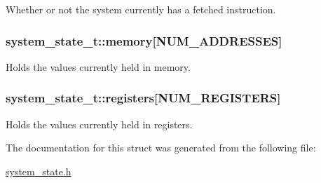 Whether or not the system currently has a fetched instruction. 

\subsubsection[{\texorpdfstring{memory}{memory}}]{ system\+\_\+state\+\_\+t\+::memory\mbox{[}{\bf N\+U\+M\+\_\+\+A\+D\+D\+R\+E\+S\+S\+ES}\mbox{]}}\hypertarget{structsystem__state__t_ade4e6995025b3b8eeeb62bdb38408765}{}\label{structsystem__state__t_ade4e6995025b3b8eeeb62bdb38408765}


Holds the values currently held in memory. 

\subsubsection[{\texorpdfstring{registers}{registers}}]{ system\+\_\+state\+\_\+t\+::registers\mbox{[}{\bf N\+U\+M\+\_\+\+R\+E\+G\+I\+S\+T\+E\+RS}\mbox{]}}\hypertarget{structsystem__state__t_af042206b1a035449b5a10250fdc29e8f}{}\label{structsystem__state__t_af042206b1a035449b5a10250fdc29e8f}


Holds the values currently held in registers. 



The documentation for this struct was generated from the following file\+:\begin{DoxyCompactItemize}
\item 
\hyperlink{system__state_8h}{system\+\_\+state.\+h}\end{DoxyCompactItemize}
